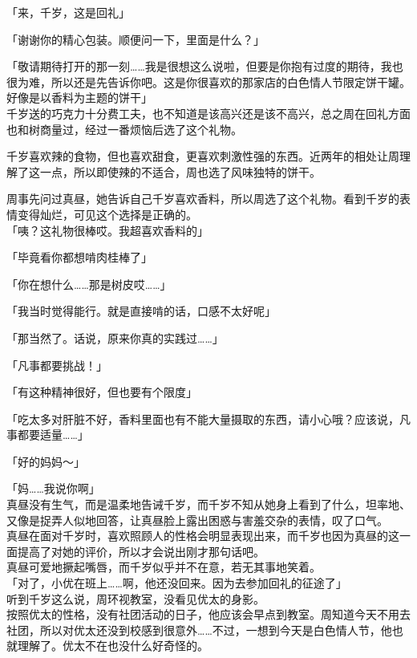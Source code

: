 「来，千岁，这是回礼」

「谢谢你的精心包装。顺便问一下，里面是什么？」

「敬请期待打开的那一刻……我是很想这么说啦，但要是你抱有过度的期待，我也很为难，所以还是先告诉你吧。这是你很喜欢的那家店的白色情人节限定饼干罐。好像是以香料为主题的饼干」\\

千岁送的巧克力十分费工夫，也不知道是该高兴还是该不高兴，总之周在回礼方面也和树商量过，经过一番烦恼后选了这个礼物。

千岁喜欢辣的食物，但也喜欢甜食，更喜欢刺激性强的东西。近两年的相处让周理解了这一点，所以即使辣的不适合，周也选了风味独特的饼干。

周事先问过真昼，她告诉自己千岁喜欢香料，所以周选了这个礼物。看到千岁的表情变得灿烂，可见这个选择是正确的。\\

「咦？这礼物很棒哎。我超喜欢香料的」

「毕竟看你都想啃肉桂棒了」

「你在想什么……那是树皮哎……」

「我当时觉得能行。就是直接啃的话，口感不太好呢」

「那当然了。话说，原来你真的实践过……」

「凡事都要挑战！」

「有这种精神很好，但也要有个限度」

「吃太多对肝脏不好，香料里面也有不能大量摄取的东西，请小心哦？应该说，凡事都要适量……」

「好的妈妈～」

「妈……我说你啊」\\

真昼没有生气，而是温柔地告诫千岁，而千岁不知从她身上看到了什么，坦率地、又像是捉弄人似地回答，让真昼脸上露出困惑与害羞交杂的表情，叹了口气。\\

真昼在面对千岁时，喜欢照顾人的性格会明显表现出来，而千岁也因为真昼的这一面提高了对她的评价，所以才会说出刚才那句话吧。\\

真昼可爱地撅起嘴唇，而千岁似乎并不在意，若无其事地笑着。\\

「对了，小优在班上……啊，他还没回来。因为去参加回礼的征途了」\\

听到千岁这么说，周环视教室，没看见优太的身影。\\

按照优太的性格，没有社团活动的日子，他应该会早点到教室。周知道今天不用去社团，所以对优太还没到校感到很意外……不过，一想到今天是白色情人节，他也就理解了。优太不在也没什么好奇怪的。\\

